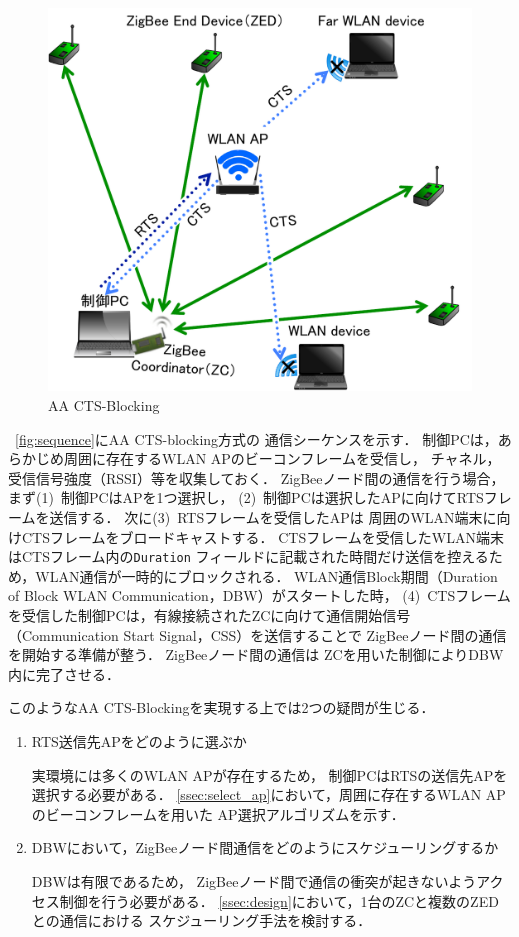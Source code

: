 \documentclass[12pt]{jreport}
\begin{document}
\begin{figure}[bt]
 \centering
 \includegraphics[width=\columnwidth]{figure/aa_cts_blocking.pdf}
 \caption{AA CTS-Blocking}
 \label{fig:aa_cts_blocking}
\end{figure}

\figurename~\ref{fig:sequence}にAA CTS-blocking方式の
通信シーケンスを示す．
制御PCは，あらかじめ周囲に存在するWLAN APのビーコンフレームを受信し，
チャネル，受信信号強度（RSSI）等を収集しておく．
ZigBeeノード間の通信を行う場合，まず(1)~制御PCはAPを1つ選択し，
(2)~制御PCは選択したAPに向けてRTSフレームを送信する．
次に(3)~RTSフレームを受信したAPは
周囲のWLAN端末に向けCTSフレームをブロードキャストする．
CTSフレームを受信したWLAN端末はCTSフレーム内の\texttt{Duration}
フィールドに記載された時間だけ送信を控えるため，WLAN通信が一時的にブロックされる．
WLAN通信Block期間（Duration of Block WLAN Communication，DBW）がスタートした時，
(4)~CTSフレームを受信した制御PCは，有線接続されたZCに向けて通信開始信号
（Communication Start Signal，CSS）を送信することで
ZigBeeノード間の通信を開始する準備が整う．
ZigBeeノード間の通信は
ZCを用いた制御によりDBW内に完了させる．

このようなAA CTS-Blockingを実現する上では2つの疑問が生じる．
\begin{enumerate}
 \item RTS送信先APをどのように選ぶか
 
	実環境には多くのWLAN APが存在するため，
	制御PCはRTSの送信先APを選択する必要がある．
	\ref{ssec:select_ap}において，周囲に存在するWLAN APのビーコンフレームを用いた
	AP選択アルゴリズムを示す．

 \item DBWにおいて，ZigBeeノード間通信をどのようにスケジューリングするか
 
 	DBWは有限であるため，
	ZigBeeノード間で通信の衝突が起きないようアクセス制御を行う必要がある．
	\ref{ssec:design}において，1台のZCと複数のZEDとの通信における
	スケジューリング手法を検討する．

\end{enumerate}
\end{document}
